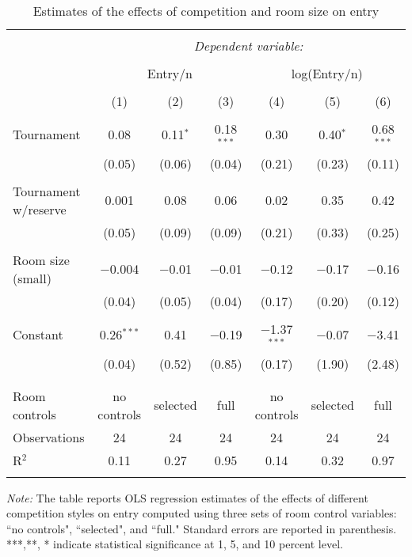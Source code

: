 \documentclass[11pt, titlepage]{article}
\begin{document}
\begin{table}
\centering
\caption{Estimates of the effects of competition and room size on entry}\label{ols entry}
\begin{tabular}{@{}lcccccc}
\\[-1.8ex]\hline 
\hline \\[-1.8ex] 
 & \multicolumn{6}{c}{\textit{Dependent variable:}} \\ 
\cline{2-7} 
\\[-1.8ex] & \multicolumn{3}{c}{Entry/n} & \multicolumn{3}{c}{log(Entry/n)} \\ 
\\[-1.8ex] & (1) & (2) & (3) & (4) & (5) & (6)\\ 
\hline \\[-1.8ex] 
 Tournament & 0.08 & 0.11$^{*}$ & 0.18$^{***}$ & 0.30 & 0.40$^{*}$ & 0.68$^{***}$ \\ 
  & (0.05) & (0.06) & (0.04) & (0.21) & (0.23) & (0.11) \\ 
  & & & & & & \\ 
 Tournament w/reserve & 0.001 & 0.08 & 0.06 & 0.02 & 0.35 & 0.42 \\ 
  & (0.05) & (0.09) & (0.09) & (0.21) & (0.33) & (0.25) \\ 
  & & & & & & \\ 
 Room size (small) & $-$0.004 & $-$0.01 & $-$0.01 & $-$0.12 & $-$0.17 & $-$0.16 \\ 
  & (0.04) & (0.05) & (0.04) & (0.17) & (0.20) & (0.12) \\ 
  & & & & & & \\ 
 Constant & 0.26$^{***}$ & 0.41 & $-$0.19 & $-$1.37$^{***}$ & $-$0.07 & $-$3.41 \\ 
  & (0.04) & (0.52) & (0.85) & (0.17) & (1.90) & (2.48) \\ 
  & & & & & & \\ 
\hline \\[-1.8ex] 
Room controls & no controls & selected & full & no controls & selected & full \\ 
Observations & 24 & 24 & 24 & 24 & 24 & 24 \\ 
R$^{2}$ & 0.11 & 0.27 & 0.95 & 0.14 & 0.32 & 0.97 \\ 
\hline 
\hline \\[-1.8ex] 
\end{tabular} 
\begin{minipage}{1.000000\textwidth}
\footnotesize\emph{Note:} The table reports OLS regression estimates of the effects of different competition styles on entry computed using three sets of room control variables: ``no controls", ``selected", and ``full." Standard errors are reported in parenthesis. ***,**, * indicate statistical significance at 1, 5, and 10 percent level.
\end{minipage}
\end{table}
\end{document}
